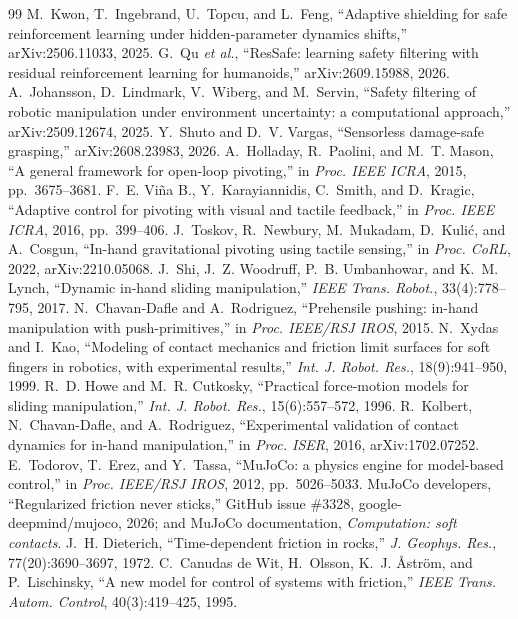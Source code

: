 \begin{thebibliography}{99}
 M.~Kwon, T.~Ingebrand, U.~Topcu, and L.~Feng, ``Adaptive shielding for safe reinforcement learning under hidden-parameter dynamics shifts,'' arXiv:2506.11033, 2025.
 G.~Qu \emph{et al.}, ``ResSafe: learning safety filtering with residual reinforcement learning for humanoids,'' arXiv:2609.15988, 2026.
 A.~Johansson, D.~Lindmark, V.~Wiberg, and M.~Servin, ``Safety filtering of robotic manipulation under environment uncertainty: a computational approach,'' arXiv:2509.12674, 2025.
 Y.~Shuto and D.~V. Vargas, ``Sensorless damage-safe grasping,'' arXiv:2608.23983, 2026.
 A.~Holladay, R.~Paolini, and M.~T. Mason, ``A general framework for open-loop pivoting,'' in \emph{Proc. IEEE ICRA}, 2015, pp.~3675--3681.
 F.~E. Vi{\~n}a B., Y.~Karayiannidis, C.~Smith, and D.~Kragic, ``Adaptive control for pivoting with visual and tactile feedback,'' in \emph{Proc. IEEE ICRA}, 2016, pp.~399--406.
 J.~Toskov, R.~Newbury, M.~Mukadam, D.~Kuli{\'c}, and A.~Cosgun, ``In-hand gravitational pivoting using tactile sensing,'' in \emph{Proc. CoRL}, 2022, arXiv:2210.05068.
 J.~Shi, J.~Z. Woodruff, P.~B. Umbanhowar, and K.~M. Lynch, ``Dynamic in-hand sliding manipulation,'' \emph{IEEE Trans. Robot.}, 33(4):778--795, 2017.
 N.~Chavan-Dafle and A.~Rodriguez, ``Prehensile pushing: in-hand manipulation with push-primitives,'' in \emph{Proc. IEEE/RSJ IROS}, 2015.
 N.~Xydas and I.~Kao, ``Modeling of contact mechanics and friction limit surfaces for soft fingers in robotics, with experimental results,'' \emph{Int. J. Robot. Res.}, 18(9):941--950, 1999.
 R.~D. Howe and M.~R. Cutkosky, ``Practical force-motion models for sliding manipulation,'' \emph{Int. J. Robot. Res.}, 15(6):557--572, 1996.
 R.~Kolbert, N.~Chavan-Dafle, and A.~Rodriguez, ``Experimental validation of contact dynamics for in-hand manipulation,'' in \emph{Proc. ISER}, 2016, arXiv:1702.07252.
 E.~Todorov, T.~Erez, and Y.~Tassa, ``MuJoCo: a physics engine for model-based control,'' in \emph{Proc. IEEE/RSJ IROS}, 2012, pp.~5026--5033.
 MuJoCo developers, ``Regularized friction never sticks,'' GitHub issue \#3328, google-deepmind/mujoco, 2026; and MuJoCo documentation, \emph{Computation: soft contacts}.
 J.~H. Dieterich, ``Time-dependent friction in rocks,'' \emph{J. Geophys. Res.}, 77(20):3690--3697, 1972.
 C.~Canudas de Wit, H.~Olsson, K.~J. {\AA}str{\"o}m, and P.~Lischinsky, ``A new model for control of systems with friction,'' \emph{IEEE Trans. Autom. Control}, 40(3):419--425, 1995.
\end{thebibliography}
